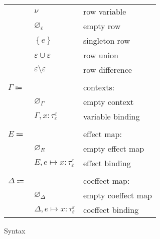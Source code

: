 \documentclass[12pt]{article}
\newcommand\anno[2]{#1 : #2}
\newcommand\evar{x}
\newcommand\tembellished[3]{{#1}^{#2}_{#3}}
\newcommand\proper{\tau}
\newcommand\row{\varepsilon}
\newcommand\rvar{\nu}
\newcommand\rempty{\varnothing_{\row}}
\newcommand\rsingleton[1]{\left\{ #1 \right\}}
\newcommand\runion[2]{#1 \cup #2}
\newcommand\rdiff[2]{#1 \setminus #2}
\newcommand\context{\Gamma}
\newcommand\cempty{\varnothing_{\context}}
\newcommand\cextend[2]{#1, #2}
\newcommand\effect{e}
\newcommand\effectmap{E}
\newcommand\coeffectmap{\Delta}
\newcommand\emempty{\varnothing_{\effectmap}}
\newcommand\ecomempty{\varnothing_{\coeffectmap}}
\newcommand\emmap[2]{#1 \mapsto #2}
\newcommand\emextend[2]{#1, #2}
\begin{document}
\begin{figure}[H]
\begin{mdframed}[backgroundcolor=none]
\begin{center}
\begin{tabular}{l l l}
              & $\rvar$ & row variable \\
              & $\rempty$ & empty row \\
              & $\rsingleton{\effect}$ & singleton row \\
              & $\runion{\row}{\row}$ & row union \\
              & $\rdiff{\row}{\row}$ & row difference \\
              \\
              $\context \Coloneqq$ & & contexts: \\
              & $\cempty$ & empty context \\
              & $\cextend{\context}{\anno{\evar}{\tembellished{\proper}{\row}{\row}}}$ & variable binding \\
              \\
              $\effectmap \Coloneqq$ & & effect map: \\
              & $\emempty$ & empty effect map \\
              & $\emextend{\effectmap}{\emmap{\effect}{\anno{\evar}{\tembellished{\proper}{\row}{\row}}}}$ & effect binding \\
              \\
              $\coeffectmap \Coloneqq$ & & coeffect map: \\
              & $\ecomempty$ & empty coeffect map \\
              & $\emextend{\coeffectmap}{\emmap{\effect}{\anno{\evar}{\tembellished{\proper}{\row}{\row}}}}$ & coeffect binding \\
            \end{tabular}
          \end{center}

          \caption{Syntax}\label{fig:syntax}
        \end{mdframed}
      \end{figure}
\end{document}
